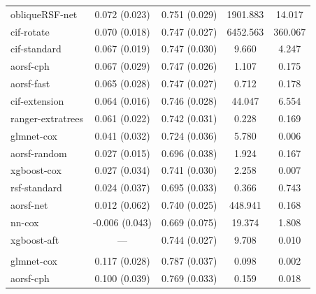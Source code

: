 \documentclass[twoside,11pt]{article}\usepackage[]{graphicx}\usepackage[]{xcolor}
\newenvironment{knitrout}{}{} %
\begin{document}
\begin{knitrout}
\begin{longtable}[t]{lcccc}
\hline
\hspace{1em}obliqueRSF-net & 0.072 (0.023) & 0.751 (0.029) & 1901.883 & 14.017\\
\hspace{1em}cif-rotate & 0.070 (0.018) & 0.747 (0.027) & 6452.563 & 360.067\\
\hspace{1em}cif-standard & 0.067 (0.019) & 0.747 (0.030) & 9.660 & 4.247\\
\hspace{1em}aorsf-cph & 0.067 (0.029) & 0.747 (0.026) & 1.107 & 0.175\\
\hspace{1em}aorsf-fast & 0.065 (0.028) & 0.747 (0.027) & 0.712 & 0.178\\
\hspace{1em}cif-extension & 0.064 (0.016) & 0.746 (0.028) & 44.047 & 6.554\\
\hspace{1em}ranger-extratrees & 0.061 (0.022) & 0.742 (0.031) & 0.228 & 0.169\\
\hspace{1em}glmnet-cox & 0.041 (0.032) & 0.724 (0.036) & 5.780 & 0.006\\
\hspace{1em}aorsf-random & 0.027 (0.015) & 0.696 (0.038) & 1.924 & 0.167\\
\hspace{1em}xgboost-cox & 0.027 (0.034) & 0.741 (0.030) & 2.258 & 0.007\\
\hspace{1em}rsf-standard & 0.024 (0.037) & 0.695 (0.033) & 0.366 & 0.743\\
\hspace{1em}aorsf-net & 0.012 (0.062) & 0.740 (0.025) & 448.941 & 0.168\\
\hspace{1em}nn-cox & -0.006 (0.043) & 0.669 (0.075) & 19.374 & 1.808\\
\hspace{1em}xgboost-aft & --- & 0.744 (0.027) & 9.708 & 0.010\\
\addlinespace[0.3em]
\multicolumn{5}{l}{\textit{\textbf{FCL; death, n = 541, p = 7}}}\\
\hline
\hspace{1em}glmnet-cox & 0.117 (0.028) & 0.787 (0.037) & 0.098 & 0.002\\
\hspace{1em}aorsf-cph & 0.100 (0.039) & 0.769 (0.033) & 0.159 & 0.018\\

\end{longtable}
\end{knitrout}
\end{document}
